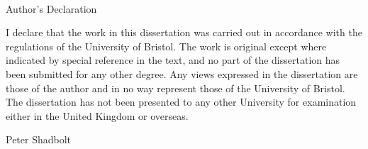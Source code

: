 \newpage
~\\
\vspace{50pt}
\begin{center}
{\Large \sc Author's Declaration \\ \rm}
\vspace{25pt}
\end{center}
I declare that the work in this dissertation was carried out in accordance with the
regulations of the University of Bristol. The work is original except where indicated by special reference in the text, and no part of the dissertation has been submitted for any other degree. Any views expressed in the dissertation are those of the author and in no way represent those of the University of Bristol. The dissertation has not been presented to any other University for examination either in the United Kingdom or overseas.  \\

\vspace{10mm}


\begin{center}
Peter Shadbolt\\
\vspace{20mm}
\underline{\hspace{5cm}}
\hspace{8mm}
\underline{\hspace{5cm}}
\vspace{25pt}



\end{center}



